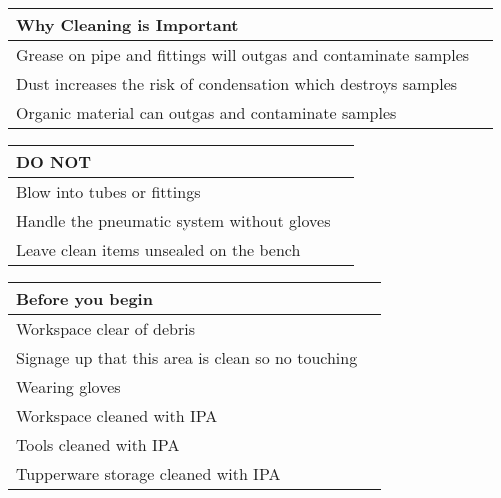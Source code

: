 \begin{longtable}{|m{}|m{}|} \hline
\textbf{Why Cleaning is Important} &  \\ \hline
Grease  on  pipe  and  fittings  will  outgas  and  contaminate  samples  & \\ \hline
Dust  increases  the  risk  of  condensation  which  destroys  samples  & \\ \hline
Organic  material  can  outgas  and  contaminate  samples &  \\ \hline
\end{longtable}
\begin{longtable}{|m{}|m{}|} \hline
\textbf{DO  NOT } &    \\ \hline
Blow  into  tubes  or  fittings  &   \\ \hline
Handle  the  pneumatic  system  without  gloves  &   \\ \hline
Leave  clean  items  unsealed  on  the  bench      &     \\ \hline
\end{longtable}
\begin{longtable}{|m{}|m{}|} \hline
\textbf{Before  you  begin}   &   \\ \hline
Workspace  clear  of  debris    &   \\ \hline
Signage  up  that  this  area  is  clean  so  no  touching   &  \\ \hline
Wearing  gloves &   \\ \hline
Workspace  cleaned  with  IPA  &  \\ \hline
Tools  cleaned  with  IPA     &    \\ \hline
Tupperware  storage  cleaned  with  IPA   &  \\ \hline
\end{longtable}
